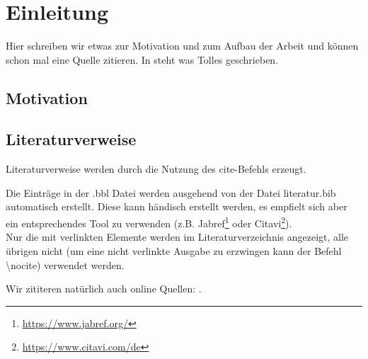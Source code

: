 \chapter{Einleitung}
\label{lab:einleitung}
Hier schreiben wir etwas zur Motivation und zum Aufbau der Arbeit und können schon mal eine Quelle zitieren. 
In \cite{Beispiel:1999} steht was Tolles geschrieben. 
\section{Motivation}
\section{Literaturverweise}\label{sec:literaturverweise}
%
Literaturverweise werden durch die Nutzung des cite-Befehls  \cite{ein_artikel} erzeugt.

Die Einträge in der .bbl Datei werden ausgehend von der Datei literatur.bib automatisch erstellt.
Diese kann händisch erstellt werden, es empfielt sich aber ein entsprechendes Tool zu verwenden (z.B. Jabref\footnote{\url{https://www.jabref.org/}} oder Citavi\footnote{\url{https://www.citavi.com/de}}).\\
Nur die mit verlinkten Elemente werden im Literaturverzeichnis angezeigt, alle übrigen nicht (um eine nicht verlinkte Ausgabe zu erzwingen kann der Befehl \textbackslash nocite) verwendet werden.
\nocite{eine_doktorarbeit}

Wir zititeren natürlich auch online Quellen: \cite{Wikipedia:2021}.

